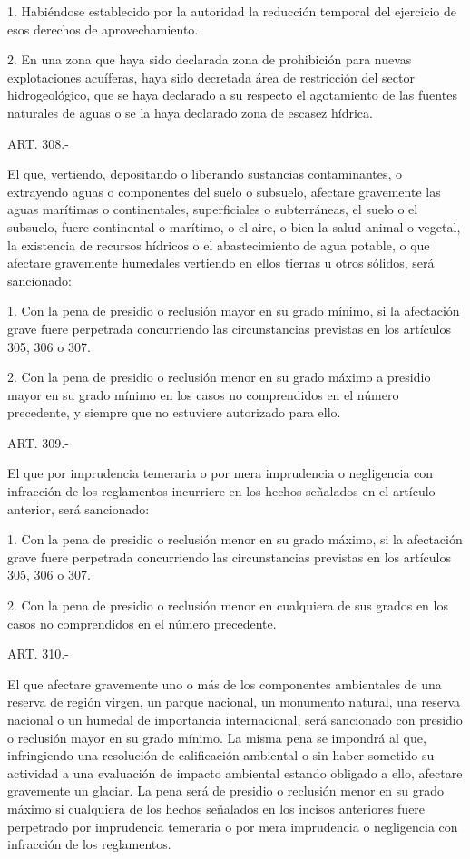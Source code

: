     1. Habiéndose establecido por la autoridad la reducción temporal del ejercicio de esos derechos de aprovechamiento.

    2. En una zona que haya sido declarada zona de prohibición para nuevas explotaciones acuíferas, haya sido decretada área de restricción del sector hidrogeológico, que se haya declarado a su respecto el agotamiento de las fuentes naturales de aguas o se la haya declarado zona de escasez hídrica.


    ART. 308.-

    El que, vertiendo, depositando o liberando sustancias contaminantes, o extrayendo aguas o componentes del suelo o subsuelo, afectare gravemente las aguas marítimas o continentales, superficiales o subterráneas, el suelo o el subsuelo, fuere continental o marítimo, o el aire, o bien la salud animal o vegetal, la existencia de recursos hídricos o el abastecimiento de agua potable, o que afectare gravemente humedales vertiendo en ellos tierras u otros sólidos, será sancionado:

    1. Con la pena de presidio o reclusión mayor en su grado mínimo, si la afectación grave fuere perpetrada concurriendo las circunstancias previstas en los artículos 305, 306 o 307.

    2. Con la pena de presidio o reclusión menor en su grado máximo a presidio mayor en su grado mínimo en los casos no comprendidos en el número precedente, y siempre que no estuviere autorizado para ello.


    ART. 309.-

    El que por imprudencia temeraria o por mera imprudencia o negligencia con infracción de los reglamentos incurriere en los hechos señalados en el artículo anterior, será sancionado:

    1. Con la pena de presidio o reclusión menor en su grado máximo, si la afectación grave fuere perpetrada concurriendo las circunstancias previstas en los artículos 305, 306 o 307.

    2. Con la pena de presidio o reclusión menor en cualquiera de sus grados en los casos no comprendidos en el número precedente.


    ART. 310.-

    El que afectare gravemente uno o más de los componentes ambientales de una reserva de región virgen, un parque nacional, un monumento natural, una reserva nacional o un humedal de importancia internacional, será sancionado con presidio o reclusión mayor en su grado mínimo.
    La misma pena se impondrá al que, infringiendo una resolución de calificación ambiental o sin haber sometido su actividad a una evaluación de impacto ambiental estando obligado a ello, afectare gravemente un glaciar.     
    La pena será de presidio o reclusión menor en su grado máximo si cualquiera de los hechos señalados en los incisos anteriores fuere perpetrado por imprudencia temeraria o por mera imprudencia o negligencia con infracción de los reglamentos.


